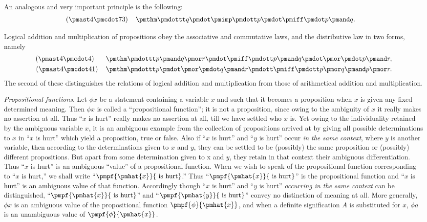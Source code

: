\documentclass[letterpaper,12pt,openany,leqno]{book}
\begin{document}
An analogous and very important principle is the following:
\begin{align*}
	(\pmast4\pmcdot73) \hspace{.4cm} & \pmthm\pmdottt q \pmdot \pmimp \pmdott p \pmdot \pmiff \pmdot p \pmand q.
\end{align*}

Logical addition and multiplication of propositions obey the associative and commutative laws, and the distributive law in two forms, namely
\begin{align*}
	(\pmast4\pmcdot4) \hspace{.6cm} & \pmthm\pmdottt p \pmand q\pmor r\pmdot\pmiff\pmdott p \pmand q \pmdot \pmor\pmdot p\pmand r, \\ 
	(\pmast4\pmcdot41) \hspace{.4cm} & \pmthm\pmdottt p \pmdot \pmor \pmdot q\pmand r\pmdott\pmiff\pmdott p \pmor q \pmand p \pmor r. 
\end{align*}
The second of these distinguishes the relations of logical addition and multiplication from those of arithmetical addition and multiplication.

\textit{Propositional functions}. Let $\phi x$ be a statement containing a variable $x$ and such that it becomes a proposition when $x$ is given any fixed determined meaning. Then $\phi x$ is called a ``propositional function''; it is not a proposition, since owing to the ambiguity of $x$ it really makes no assertion at all. Thus ``$x$ is hurt'' really makes no assertion at all, till we have settled who $x$ is. Yet owing to the individuality retained by the ambiguous variable $x$, it is an ambiguous example from the collection of propositions arrived at by giving all possible determinations to $x$ in ``$x$ is hurt'' which yield a proposition, true or false. Also if ``$x$ is hurt'' and ``$y$ is hurt'' occur \textit{in the same context}, where $y$ is another variable, then according to the determinations given to $x$ and $y$, they can be settled to be (possibly) the same proposition or (possibly) different propositions. But apart from some determination given to x and $y$, they retain in that context their ambiguous differentiation. Thus ``$x$ is hurt'' is an ambiguous ``value'' of a propositional function. When we wish to speak of the propositional function corresponding to ``$x$ is hurt,'' we shall write ``$\pmpf{\pmhat{x}}{\text{ is hurt}}$.'' Thus ``$\pmpf{\pmhat{x}}{\text{ is hurt}}$'' is the propositional function and ``$x$ is hurt'' is an ambiguous value of that function. Accordingly though ``$x$ is hurt'' and ``$y$ is hurt'' \textit{occurring in the same context} can be distinguished, ``$\pmpf{\pmhat{x}}{\text{ is hurt}}$'' and ``$\pmpf{\pmhat{y}}{\text{ is hurt}}$'' convey no distinction of meaning at all. More generally, $\phi x$ is an ambiguous value of the propositional function $\pmpf{\phi}{\pmhat{x}}$, and when a definite signification $A$ is substituted for $x$, $\phi a$ is an unambiguous value of $\pmpf{\phi}{\pmhat{x}}$.
\end{document}

